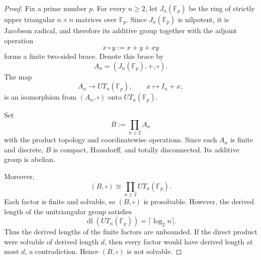 \documentclass[10pt,a4paper]{amsart}
\begin{document}
\begin{proof}
Fix a prime number $p$. For every $n\ge 2$, let $J_n(\mathbb F_p)$ be the ring
of strictly upper triangular $n\times n$ matrices over $\mathbb F_p$. Since
$J_n(\mathbb F_p)$ is nilpotent, it is Jacobson radical, and therefore its
additive group together with the adjoint operation
\[
x\circ y:=x+y+xy
\]
forms a finite two-sided brace. Denote this brace by
\[
A_n=(J_n(\mathbb F_p),+,\circ).
\]
The map
\[
A_n\longrightarrow UT_n(\mathbb F_p),
\qquad
x\longmapsto I_n+x,
\]
is an isomorphism from $(A_n,\circ)$ onto $UT_n(\mathbb F_p)$.

Set
\[
B:=\prod_{n\ge 2} A_n
\]
with the product topology and coordinatewise operations. Since each $A_n$ is
finite and discrete, $B$ is compact, Hausdorff, and totally disconnected. Its
additive group is abelian.

Moreover,
\[
(B,\circ)\cong \prod_{n\ge 2}UT_n(\mathbb F_p).
\]
Each factor is finite and solvable, so $(B,\circ)$ is prosolvable. However, the
derived length of the unitriangular group satisfies
\[
\operatorname{dl}(UT_n(\mathbb F_p))=\lceil\log_2 n\rceil .
\]
Thus the derived lengths of the finite factors are unbounded. If the direct
product were solvable of derived length $d$, then every factor would have
derived length at most $d$, a contradiction. Hence $(B,\circ)$ is not solvable.
\end{proof}
\end{document}
